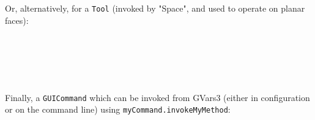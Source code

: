 \documentclass[a4paper,10pt]{article}
\begin{document}
Or, alternatively, for a \texttt{Tool} (invoked by "Space", and used to operate on planar faces):

\noindent
\ttfamily
\hlstd{}\hlstd{}\hlopt{(\ }\hlopt{,\ }\hlstd{}\hlstd{}\hlopt{,\ }\hlstd{}\hlstd{}\hlopt{,\ );}\\
\hlstd{}\hlopt{::}\hlstd{}\hlstd{}\hlopt{()\ \usebox{\hlboxopenbrace}}\\
\hlstd{}\hlstd{\ \ \ \ }\hlopt{::}\hlstd{}\hlstd{}\hlopt{(\ }\hlstd{}\hlstd{\ }\hlopt{);}\\
\hlstd{}\hlopt{\usebox{\hlboxclosebrace}}\hlstd{}\\
\mbox{}
\normalfont
\normalsize

Finally, a \texttt{GUICommand} which can be invoked from GVars3 (either in configuration or on the command line) using \texttt{myCommand.invokeMyMethod}:

\noindent
\ttfamily
\hlstd{}\hlstd{}\hlopt{(\ }\hlopt{,\ }\hlopt{,\ );}\\
\hlstd{}\hlopt{::}\hlstd{}\hlstd{}\hlopt{(\ }\hlopt{)\ \usebox{\hlboxopenbrace}}\\
\hlstd{}\hlstd{\ \ \ \ }\hlstd{}\\
\hlstd{}\hlopt{\usebox{\hlboxclosebrace}}\hlstd{}\\
\mbox{}
\normalfont
\normalsize
\end{document}
